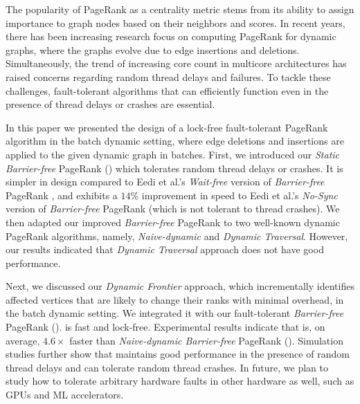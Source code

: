 The popularity of PageRank as a centrality metric stems from its ability to assign importance to graph nodes based on their neighbors and scores. In recent years, there has been increasing research focus on computing PageRank for dynamic graphs, where the graphs evolve due to edge insertions and deletions. Simultaneously, the trend of increasing core count in multicore architectures has raised concerns regarding random thread delays and failures. To tackle these challenges, fault-tolerant algorithms that can efficiently function even in the presence of thread delays or crashes are essential.

In this paper we presented the design of a lock-free fault-tolerant PageRank algorithm in the batch dynamic setting, where edge deletions and insertions are applied to the given dynamic graph in batches. First, we introduced our \textit{Static Barrier-free} PageRank (\StaBarf{}) which tolerates random thread delays or crashes. It is simpler in design compared to Eedi et al.'s \textit{Wait-free} version of \textit{Barrier-free} PageRank \cite{rank-eedi22}, and exhibits a $14\%$ improvement in speed to Eedi et al.'s \textit{No-Sync} version of \textit{Barrier-free} PageRank (which is not tolerant to thread crashes). We then adapted our improved \textit{Barrier-free} PageRank to two well-known dynamic PageRank algorithms, namely, \textit{Naive-dynamic} and \textit{Dynamic Traversal}. However, our results indicated that \textit{Dynamic Traversal} approach does not have good performance.

Next, we discussed our \textit{Dynamic Frontier} approach, which incrementally identifies affected vertices that are likely to change their ranks with minimal overhead, in the batch dynamic setting. We integrated it with our fault-tolerant \textit{Barrier-free} PageRank (\FroBarf{}). \FroBarf{} is fast and lock-free. Experimental results indicate that \FroBarf{} is, on average, $4.6\times$ faster than \textit{Naive-dynamic Barrier-free} PageRank (\NaiBarf{}). Simulation studies further show that \FroBarf{} maintains good performance in the presence of random thread delays and can tolerate random thread crashes. In future, we plan to study how to tolerate arbitrary hardware faults in other hardware as well, such as GPUs and ML accelerators.
